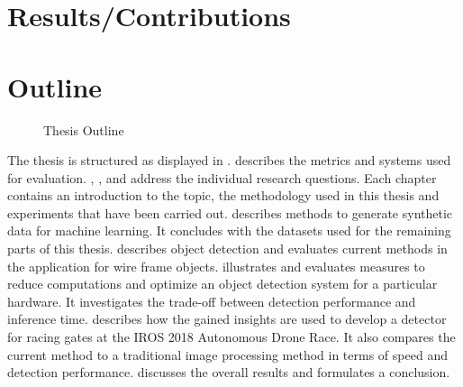 \section{Results/Contributions}


\section{Outline}

\begin{figure}[hbtp]
	\centering
	\caption{Thesis Outline}
	\label{fig:outline}
\end{figure}


The thesis is structured as displayed in .  describes the metrics and systems used for evaluation. , ,  and  address the individual research questions. Each chapter contains an introduction to the topic, the methodology used in this thesis and experiments that have been carried out.  describes methods to generate synthetic data for machine learning. It concludes with the datasets used for the remaining parts of this thesis.   describes object detection and evaluates current methods in the application for wire frame objects.  illustrates and evaluates measures to reduce computations and optimize an object detection system for a particular hardware. It investigates the trade-off between detection performance and inference time.  describes how the gained insights are used to develop a detector for racing gates at the \ac{IROS} 2018 Autonomous Drone Race. It also compares the current method to a traditional image processing method in terms of speed and detection performance.  discusses the overall results and formulates a conclusion.



